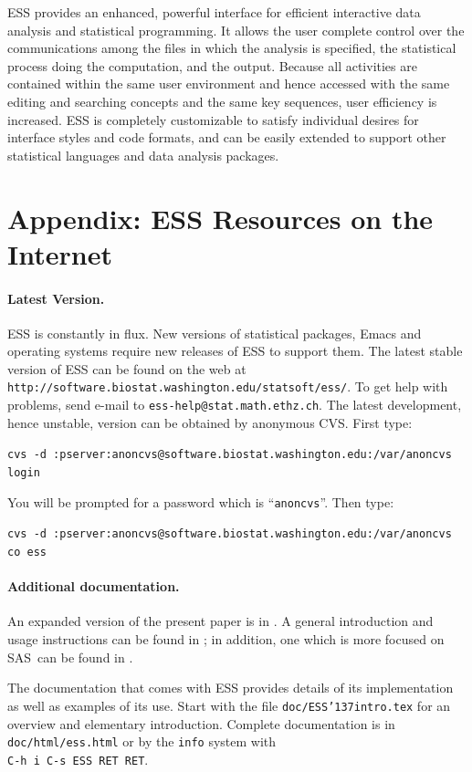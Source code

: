 \documentclass{article}
\def\url#1{\stexttt{#1}} %
\newcommand*{\SAS}{\textsc{SAS}}
\newcommand{\stexttt}[1]{{\small\texttt{#1}}}
\newcommand{\US}{{\char'137}}        %
\begin{document}
ESS provides an enhanced, powerful interface for efficient interactive
data analysis and statistical programming.  It allows the user
complete control over the communications among the files in which the
analysis is specified, the statistical process doing the computation,
and the output.  Because all activities are contained within the same
user environment and hence accessed with the same editing and
searching concepts and the same key sequences, user efficiency is
increased.  ESS is completely customizable to satisfy individual
desires for interface styles and code formats, and can be easily
extended to support other statistical languages and data analysis
packages.




\clearpage

\appendix
\section{Appendix: ESS Resources on the Internet}
\label{sec:access}

\paragraph{Latest Version.}

ESS is constantly in flux.  New versions of statistical packages,
Emacs and operating systems require new releases of ESS to support
them.  The latest stable version of ESS can be found on the web at
\url{http://software.biostat.washington.edu/statsoft/ess/}.  To get
help with problems, send e-mail to \url{ess-help@stat.math.ethz.ch}.
The latest development, hence unstable, version can be obtained by
anonymous CVS.  First type:

\stexttt{cvs -d
  :pserver:anoncvs@software.biostat.washington.edu:/var/anoncvs login}

You will be prompted for a password which is ``\stexttt{anoncvs}''.
Then type:

\stexttt{cvs -d
  :pserver:anoncvs@software.biostat.washington.edu:/var/anoncvs co
  ess}

\paragraph{Additional documentation.}

An expanded version of the present paper is in \citep{RMHHS:2001}.  A
general introduction and usage instructions can be found in
\citep{heiberger:dsc:2001}; in addition, one which is more focused on
\SAS\ can be found in \citep{heiberger:philasugi:2001}.

The documentation that comes with ESS provides details of its
implementation as well as examples of its use.  Start with the file
\stexttt{doc/ESS{\US}intro.tex} for an overview and elementary
introduction.  Complete documentation is in
\stexttt{doc/html/ess.html} or by the \stexttt{info} system with\\
\stexttt{C-h i C-s ESS RET RET}.
\end{document}
